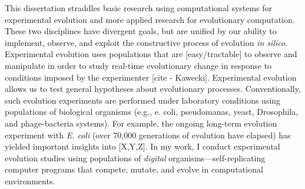 


This dissertation straddles basic research using computational systems for experimental evolution and more applied research for evolutionary computation.
These two disciplines have divergent goals, but are unified by our ability to implement, observe, and exploit the constructive process of evolution \textit{in silico}.
Experimental evolution uses populations that are [easy/tractable] to observe and manipulate in order to study real-time evolutionary change in response to conditions imposed by the experimenter [cite - Kawecki].
Experimental evolution allows us to test general hypotheses about evolutionary processes. 
Conventionally, such evolution experiments are performed under laboratory conditions using populations of biological organisms (e.g., e. coli, pseudomanas, yeast, Drosophila, and phage-bacteria systems). 
For example, the ongoing long-term evolution experiment with \textit{E. coli} (over 70,000 generations of evolution have elapsed) has yielded important insights into [X,Y,Z].
In my work, I conduct experimental evolution studies using populations of \textit{digital} organisms---self-replicating computer programs that compete, mutate, and evolve in computational environments.


